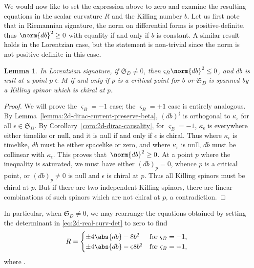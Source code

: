 \documentclass[pdftex]{sigma}
\numberwithin{equation}{section}
\newtheorem{Lemma}[Theorem]{Lemma}
\newcommand{\fS}{\mathfrak{S}}
\newcommand{\1}{\mathbbm{1}}
\begin{document}
We would now like to set the expression above to zero and examine the resulting equations in the scalar curvature $R$ and the Killing number $b$. Let us first note that in Riemannian signature, the norm on differential forms is positive-definite, thus $\norm{db}^2\geq 0$ with equality if and only if $b$ is constant. A similar result holds in the Lorentzian case, but the statement is non-trivial since the norm is not positive-definite in this case.

\begin{Lemma}
	In Lorentzian signature, if $\fS_D\neq 0$, then $\varsigma_B\norm{db}^2\leq 0$, and $db$ is null at a point $p\in M$ if and only if $p$ is a critical point for $b$ or $\fS_D$ is spanned by a Killing spinor which is chiral at $p$.
\end{Lemma}

\begin{proof}
	We will prove the $\varsigma_B=-1$ case; the $\varsigma_B=+1$ case is entirely analogous. By Lemma~\ref{lemma:2d-dirac-current-preserve-beta}, $(db)^\sharp$ is orthogonal to $\kappa_\epsilon$ for all $\epsilon\in\fS_D$. By Corollary~\ref{coro:2d-dirac-causality}, for $\varsigma_B=-1$, $\kappa_\epsilon$ is everywhere either timelike or null, and it is null if and only if $\epsilon$ is chiral. Thus where $\kappa_\epsilon$ is timelike, $db$ must be either spacelike or zero, and where $\kappa_\epsilon$ is null, $db$ must be collinear with $\kappa_\epsilon$. This proves that~$\norm{db}^2\geq 0$. At a point $p$ where the inequality is saturated, we must have either $(db)_p=0$, whence $p$ is a critical point, or $(db)_p\neq 0$ is null and $\epsilon$ is chiral at $p$. Thus all Killing spinors must be chiral at $p$. But if there are two independent Killing spinors, there are linear combinations of such spinors which are not chiral at $p$, a contradiction.
\end{proof}

In particular, when $\fS_D\neq 0$, we may rearrange the equations obtained by setting the determinant in \eqref{eq:2d-real-curv-det} to zero to find
\begin{equation}\label{eq:2d-scalar-curv-formula}
	R =
		\begin{cases}
			\pm 4\abs{db} - 8b^2	& \text{for } \varsigma_B=-1,	\\
			\pm 4\abs{db} - \varsigma 8b^2		& \text{for } \varsigma_B=+1,
		\end{cases}
\end{equation}
where .
\end{document}
